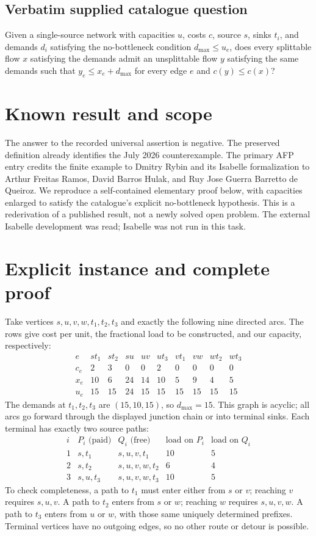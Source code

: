 \documentclass[11pt]{article}
\begin{document}
\subsection{Verbatim supplied catalogue question}
Given a single-source network with capacities $u$, costs $c$, source $s$, sinks $t_i$, and demands $d_i$ satisfying the no-bottleneck condition $d_{\max}\leq u_e$, does every splittable flow $x$ satisfying the demands admit an unsplittable flow $y$ satisfying the same demands such that $y_e\leq x_e+d_{\max}$ for every edge $e$ and $c(y)\leq c(x)$?

\section{Known result and scope}
The answer to the recorded universal assertion is negative. The preserved
definition already identifies the July 2026 counterexample. The primary AFP
entry credits the finite example to Dmitry Rybin and its Isabelle formalization
to Arthur Freitas Ramos, David Barros Hulak, and Ruy Jose Guerra Barretto de
Queiroz. We reproduce a self-contained elementary proof below, with capacities
enlarged to satisfy the catalogue's explicit no-bottleneck hypothesis.
This is a rederivation of a published result, not a newly solved open problem.
The external Isabelle development was read; Isabelle was not run in this task.

\section{Explicit instance and complete proof}
Take vertices $s,u,v,w,t_1,t_2,t_3$ and exactly the following nine directed
arcs. The rows give cost per unit, the fractional load to be constructed,
and our capacity, respectively:
\[
\begin{array}{c|rrrrrrrrr}
e&st_1&st_2&su&uv&ut_3&vt_1&vw&wt_2&wt_3\\\hline
c_e&2&3&0&0&2&0&0&0&0\\
x_e&10&6&24&14&10&5&9&4&5\\
u_e&15&15&24&15&15&15&15&15&15
\end{array}
\]
The demands at $t_1,t_2,t_3$ are $(15,10,15)$, so $d_{\max}=15$.
This graph is acyclic; all arcs go forward through the displayed junction
chain or into terminal sinks. Each terminal has exactly two source paths:
\[
\begin{array}{c|l|l|c|c}
 i& P_i\text{ (paid)}&Q_i\text{ (free)}&\text{load on }P_i&\text{load on }Q_i\\\hline
1&s,t_1&s,u,v,t_1&10&5\\
2&s,t_2&s,u,v,w,t_2&6&4\\
3&s,u,t_3&s,u,v,w,t_3&10&5
\end{array}
\]
To check completeness, a path to $t_1$ must enter either from $s$ or $v$;
reaching $v$ requires $s,u,v$. A path to $t_2$ enters from $s$ or $w$;
reaching $w$ requires $s,u,v,w$. A path to $t_3$ enters from $u$ or $w$,
with those same uniquely determined prefixes. Terminal vertices have no
outgoing edges, so no other route or detour is possible.
\end{document}
